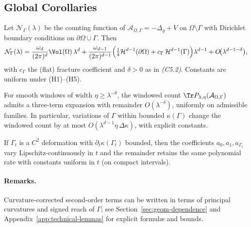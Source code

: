 \subsection{Global Corollaries}
\label{subsec:05-corollaries}

\begin{corollary}
\label{cor:lwl-fracture}
Let $\mathcal{N}_\Gamma(\lambda)$ be the counting function of
$\mathcal{A}_{\Omega,\Gamma}=-\Delta_g+V$ on $\Omega\setminus\Gamma$
with Dirichlet boundary conditions on $\partial\Omega\cup\Gamma$. Then
\[
\mathcal{N}_\Gamma(\lambda)
= \frac{\omega_d}{(2\pi)^d}\Vol(\Omega)\,\lambda^d
+ \frac{\omega_{d-1}}{(2\pi)^{d-1}}
  \Big( \tfrac{1}{4}\mathcal{H}^{d-1}(\partial\Omega)
        + c_\Gamma\,\mathcal{H}^{d-1}(\Gamma)\Big)\lambda^{d-1}
+ O\!\big(\lambda^{d-1-\delta}\big),
\]
with $c_\Gamma$ the (flat) fracture coefficient and $\delta>0$
as in \emph{(C5.2)}. Constants are uniform under (H1)--(H5).
\end{corollary}

\begin{corollary}
\label{cor:window-stability}
For smooth windows of width $\eta\ge \lambda^{-\theta}$,
the windowed count $\Tr P_{\lambda,\eta}(\mathcal{A}_{\Omega,\Gamma})$
admits a three-term expansion with remainder
$O(\lambda^{-\delta})$, uniformly on admissible families. In particular,
variations of $\Gamma$ within bounded $\kappa(\Gamma)$ change the windowed
count by at most $O(\lambda^{d-1}\eta\,\Delta \kappa)$, with explicit constants.
\end{corollary}

\begin{corollary}
\label{cor:shape-stab}
If $\Gamma_t$ is a $C^2$ deformation with $\partial_t\kappa(\Gamma_t)$ bounded,
then the coefficients $a_0,a_1,a_{\Gamma_t}$ vary Lipschitz-continuously in $t$
and the remainder retains the same polynomial rate with constants uniform in $t$
(on compact intervals).
\end{corollary}

\paragraph{Remarks.}
Curvature-corrected second-order terms can be written in terms of principal
curvatures and signed reach of $\Gamma$; see Section~\ref{sec:geom-dependence}
and Appendix~\ref{app:technical-lemmas} for explicit formulæ and bounds.

